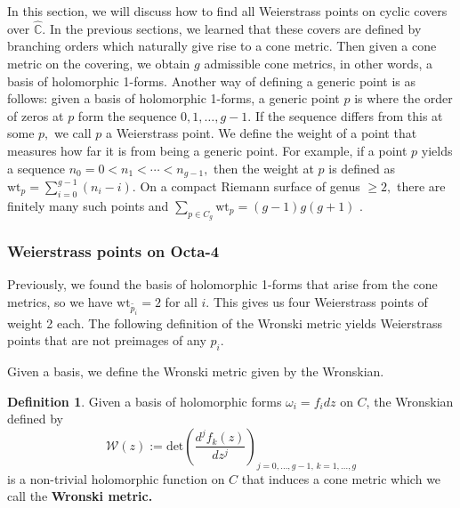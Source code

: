 \documentclass[12pt,reqno]{amsart}
\DeclareMathOperator{\Aut}{Aut}
\newcommand{\C}{\mathbb{C}}
\newtheorem*{proposition}{Proposition}
\theoremstyle{definition}
\newtheorem{defn}{Definition}
\theoremstyle{remark}
\begin{document}
In this section, we will discuss how to find all Weierstrass points on cyclic covers over $\widehat{\C}.$ In the previous sections, we learned that these covers are defined by branching orders which naturally give rise to a cone metric. Then given a cone metric on the covering, we obtain $g$ admissible cone metrics, in other words, a basis of holomorphic 1-forms. Another way of defining a generic point is as follows: given a basis of holomorphic 1-forms, a generic point $p$ is where the order of zeros at $p$ form the sequence $0, 1, \ldots , g - 1.$ If the sequence differs from this at some $p,$ we call $p$ a Weierstrass point. We define the weight of a point that measures how far it is from being a generic point. For example, if a point $p$ yields a sequence $n_0 = 0 < n_1 < \cdots < n_{g-1},$ then the weight at $p$ is defined as $\textrm{wt}_p = \sum\limits_{i=0}^{g-1} (n_i - i).$ On a compact Riemann surface of genus $\geq 2,$ there are finitely many such points and $\sum\limits_{p \in C_g} \textrm{wt}_p = (g - 1) g (g + 1)$ \cite{fk}. 



\subsubsection*{Weierstrass points on Octa-4} Previously, we found the basis of holomorphic 1-forms that arise from the cone metrics, so we have $\textrm{wt}_{\widetilde{p_i}} = 2$ for all $i.$ This gives us four Weierstrass points of weight 2 each. The following definition of the Wronski metric yields Weierstrass points that are not preimages of any $p_i.$


Given a basis, we define the Wronski metric given by the Wronskian.

\begin{defn}\label{def: wronski} Given a basis of holomorphic forms $\omega_i = f_i d z$ on $C$, the Wronskian defined by $$\mathcal{W}(z) := \textrm{det} \left( \frac{d^j f_k(z)}{d z^j} \right)_{j = 0, \ldots , g - 1, \, k = 1, \ldots , g}$$ is a non-trivial holomorphic function on $C$ that induces a cone metric which we call the \textbf{Wronski metric.} \end{defn}
\end{document}
